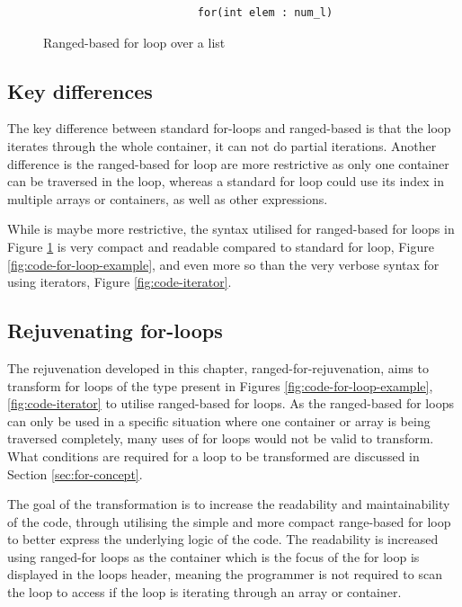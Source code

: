 \documentclass[bsc,frontabs,singlespacing,twoside,parskip,deptreport]{infthesis}
\begin{document}
\begin{figure}[H]
    \begin{verbatim}
                        for(int elem : num_l)
    \end{verbatim}
    \caption{Ranged-based for loop over a list}
    \centering
    \label{fig:code-ranged-based-for}
\end{figure}

\subsection{Key differences}

The key difference between standard for-loops and ranged-based is that the loop iterates through the whole container, it can not do partial iterations. Another difference is the ranged-based for loop are more restrictive as only one container can be traversed in the loop, whereas a standard for loop could use its index in multiple arrays or containers, as well as other expressions. 

While is maybe more restrictive, the syntax utilised for ranged-based for loops in Figure \ref{fig:code-ranged-based-for} is very compact and readable compared to standard for loop, Figure \ref{fig:code-for-loop-example}, and even more so than the very verbose syntax for using iterators, Figure \ref{fig:code-iterator}.

\subsection{Rejuvenating for-loops}
The rejuvenation developed in this chapter, ranged-for-rejuvenation, aims to transform for loops of the type present in Figures \ref{fig:code-for-loop-example}, \ref{fig:code-iterator} to utilise ranged-based for loops. As the ranged-based for loops can only be used in a specific situation where one container or array is being traversed completely, many uses of for loops would not be valid to transform. What conditions are required for a loop to be transformed are discussed in Section \ref{sec:for-concept}. 

The goal of the transformation is to increase the readability and maintainability of the code, through utilising the simple and more compact range-based for loop to better express the underlying logic of the code. The readability is increased using ranged-for loops as the container which is the focus of the for loop is displayed in the loops header, meaning the programmer is not required to scan the loop to access if the loop is iterating through an array or container.
\end{document}
